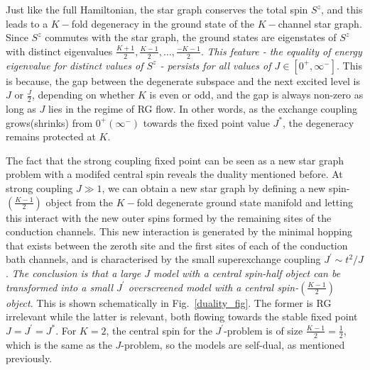 \documentclass[12pt]{revtex4-2}
\begin{document}
Just like the full Hamiltonian, the star graph conserves the total spin \(S^z\), and this leads to a \(K-\)fold degeneracy in the ground state of the \(K-\)channel star graph. Since \(S^z\) commutes with the star graph, the ground states are eigenstates of \(S^z\) with distinct eigenvalues \(\frac{K+1}{2}, \frac{K-1}{2},\ldots,\frac{-K-1}{2}\). \textit{This feature - the equality of energy eigenvalue for distinct values of \(S^z\) - persists for all values of \(J \in \left[0^+, \infty^-\right]\)}. This is because, the gap between the degenerate subspace and the next excited level is \(J\) or \(\frac{J}{2}\), depending on whether \(K\) is even or odd, and the gap is always non-zero as long as \(J\) lies in the regime of RG flow. In other words, as the exchange coupling grows(shrinks) from \(0^+\left(\infty^-\right)\) towards the fixed point value \(J^*\), the degeneracy remains protected at \(K\).

The fact that the strong coupling fixed point can be seen as a new star graph problem with a modifed central spin reveals the duality mentioned before. At strong coupling \(J \gg 1\), we can obtain a new star graph by defining a new spin-\(\left(\frac{K-1}{2}\right)\) object from the \(K-\)fold degenerate ground state manifold and letting this interact with the new outer spins formed by the remaining sites of the conduction channels. This new interaction is generated by the minimal hopping that exists between the zeroth site and the first sites of each of the conduction bath channels, and is characterised by the small superexchange coupling \(J^\prime \sim t^2/J\). \textit{The conclusion is that a large \(J\) model with a central spin-half object can be transformed into a small \(J^\prime\) overscreened model with a central spin-\(\left(\frac{K-1}{2}\right)\) object}. This is shown schematically in Fig.~\ref{duality_fig}. The former is RG irrelevant while the latter is relevant, both flowing towards the stable fixed point \(J = J^\prime = J^*\). For \(K=2\), the central spin for the \(J^\prime\)-problem is of size \(\frac{K-1}{2} = \frac{1}{2}\), which is the same as the \(J\)-problem, so the models are self-dual, as mentioned previously.
\end{document}
